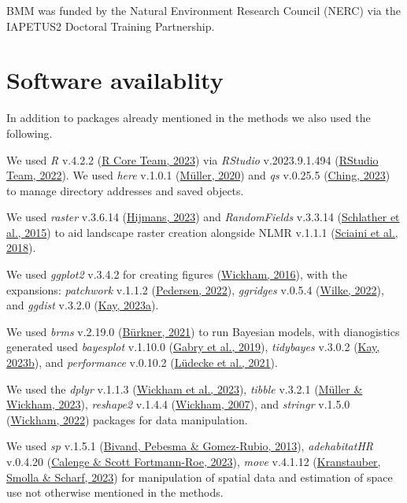 \documentclass[10pt,a4paper]{article}
\begin{document}
BMM was funded by the Natural Environment Research Council (NERC) via the IAPETUS2 Doctoral Training Partnership.

\hypertarget{software-availablity}{%
\section{Software availablity}\label{software-availablity}}

In addition to packages already mentioned in the methods we also used the following.

We used \emph{R} v.4.2.2 (\protect\hyperlink{ref-base}{R Core Team, 2023}) via \emph{RStudio} v.2023.9.1.494 (\protect\hyperlink{ref-rstudio}{RStudio Team, 2022}).
We used \emph{here} v.1.0.1 (\protect\hyperlink{ref-here}{Müller, 2020}) and \emph{qs} v.0.25.5 (\protect\hyperlink{ref-qs}{Ching, 2023}) to manage directory addresses and saved objects.

We used \emph{raster} v.3.6.14 (\protect\hyperlink{ref-raster}{Hijmans, 2023}) and \emph{RandomFields} v.3.3.14 (\protect\hyperlink{ref-RandomFields}{Schlather et al., 2015}) to aid landscape raster creation alongside NLMR v.1.1.1 (\protect\hyperlink{ref-NLMR}{Sciaini et al., 2018}).

We used \emph{ggplot2} v.3.4.2 for creating figures (\protect\hyperlink{ref-ggplot2}{Wickham, 2016}), with the expansions: \emph{patchwork} v.1.1.2 (\protect\hyperlink{ref-patchwork}{Pedersen, 2022}), \emph{ggridges} v.0.5.4 (\protect\hyperlink{ref-ggridges}{Wilke, 2022}), and \emph{ggdist} v.3.2.0 (\protect\hyperlink{ref-ggdist}{Kay, 2023a}).

We used \emph{brms} v.2.19.0 (\protect\hyperlink{ref-brms}{Bürkner, 2021}) to run Bayesian models, with dianogistics generated used \emph{bayesplot} v.1.10.0 (\protect\hyperlink{ref-bayesplot}{Gabry et al., 2019}), \emph{tidybayes} v.3.0.2 (\protect\hyperlink{ref-tidybayes}{Kay, 2023b}), and \emph{performance} v.0.10.2 (\protect\hyperlink{ref-performance}{Lüdecke et al., 2021}).

We used the \emph{dplyr} v.1.1.3 (\protect\hyperlink{ref-dplyr}{Wickham et al., 2023}), \emph{tibble} v.3.2.1 (\protect\hyperlink{ref-tibble}{Müller \& Wickham, 2023}), \emph{reshape2} v.1.4.4 (\protect\hyperlink{ref-reshape2}{Wickham, 2007}), and \emph{stringr} v.1.5.0 (\protect\hyperlink{ref-stringr}{Wickham, 2022}) packages for data manipulation.

We used \emph{sp} v.1.5.1 (\protect\hyperlink{ref-sp}{Bivand, Pebesma \& Gomez-Rubio, 2013}), \emph{adehabitatHR} v.0.4.20 (\protect\hyperlink{ref-adehabitatHR}{Calenge \& Scott Fortmann-Roe, 2023}), \emph{move} v.4.1.12 (\protect\hyperlink{ref-move}{Kranstauber, Smolla \& Scharf, 2023}) for manipulation of spatial data and estimation of space use not otherwise mentioned in the methods.
\end{document}
